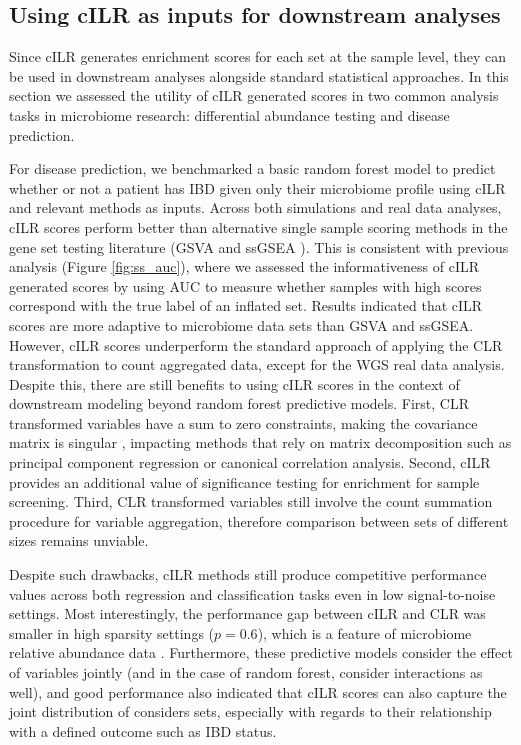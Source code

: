 \documentclass[10pt,letterpaper]{article}
\begin{document}
\subsection*{Using cILR as inputs for downstream analyses}
Since cILR generates enrichment scores for each set at the sample level, they can be used in downstream analyses alongside standard statistical approaches. In this section we assessed the utility of cILR generated scores in two common analysis tasks in microbiome research: differential abundance testing and disease prediction.

For disease prediction, we benchmarked a basic random forest model \cite{breiman2001} to predict whether or not a patient has IBD given only their microbiome profile using cILR and relevant methods as inputs. Across both simulations and real data analyses, cILR scores perform better than alternative single sample scoring methods in the gene set testing literature (GSVA \cite{hanzelmann2013} and ssGSEA \cite{barbie2009}). This is consistent with previous analysis (Figure \ref{fig:ss_auc}), where we assessed the informativeness of cILR generated scores by using AUC to measure whether samples with high scores correspond with the true label of an inflated set. Results indicated that cILR scores are more adaptive to microbiome data sets than GSVA and ssGSEA. However, cILR scores underperform the standard approach of applying the CLR transformation to count aggregated data, except for the WGS real data analysis. Despite this, there are still benefits to using cILR scores in the context of downstream modeling beyond random forest predictive models. First, CLR transformed variables have a sum to zero constraints, making the covariance matrix is singular \cite{gloor2017}, impacting methods that rely on matrix decomposition such as principal component regression or canonical correlation analysis. Second, cILR provides an additional value of significance testing for enrichment for sample screening. Third, CLR transformed variables still involve the count summation procedure for variable aggregation, therefore comparison between sets of different sizes remains unviable.       

Despite such drawbacks, cILR methods still produce competitive performance values across both regression and classification tasks even in low signal-to-noise settings. Most interestingly, the performance gap between cILR and CLR was smaller in high sparsity settings ($p = 0.6$), which is a feature of microbiome relative abundance data \cite{li2019}. Furthermore, these predictive models consider the effect of variables jointly (and in the case of random forest, consider interactions as well), and good performance also indicated that cILR scores can also capture the joint distribution of considers sets, especially with regards to their relationship with a defined outcome such as IBD status.   
\end{document}
